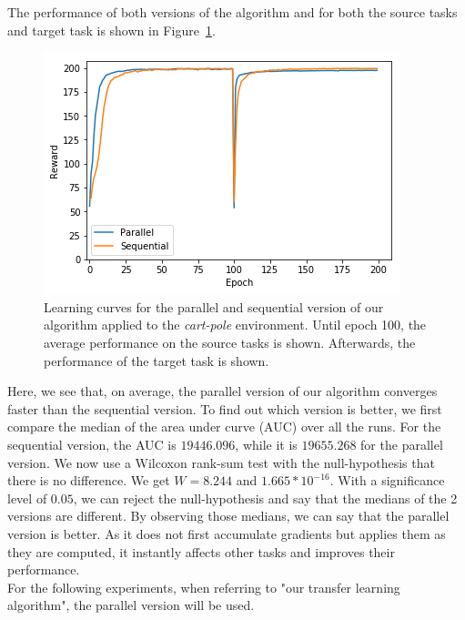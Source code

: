 The performance of both versions of the algorithm and for both the source tasks and target task is shown in Figure~\ref{fig:CartPole:reward_akt-kt_all_5tasks}.
\begin{figure}[htb]
    \centering
    \includegraphics[width=.8\linewidth]{images/results/CartPole/kt_akt/reward_source-target_5tasks.png}
    \caption[Learning curves for the parallel and sequential version of our algorithm applied to the \textit{cart-pole} environment]{Learning curves for the parallel and sequential version of our algorithm applied to the \textit{cart-pole} environment. Until epoch 100, the average performance on the source tasks is shown. Afterwards, the performance of the target task is shown.}
    \label{fig:CartPole:reward_akt-kt_all_5tasks}
\end{figure}
Here, we see that, on average, the parallel version of our algorithm converges faster than the sequential version.
To find out which version is better, we first compare the median of the area under curve (AUC) over all the runs.
For the sequential version, the AUC is $19446.096$, while it is $19655.268$ for the parallel version.
We now use a Wilcoxon rank-sum test with the null-hypothesis that there is no difference.
We get $W=8.244$ and $1.665*10^{-16}$.
With a significance level of $0.05$, we can reject the null-hypothesis and say that the medians of the 2 versions are different.
By observing those medians, we can say that the parallel version is better. As it does not first accumulate gradients but applies them as they are computed, it instantly affects other tasks and improves their performance.\\
For the following experiments, when referring to "our transfer learning algorithm", the parallel version will be used.


